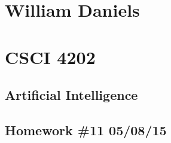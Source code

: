 \documentclass[11pt]{article}
\begin{document}
\begin{center}
\section*{William Daniels}
\section*{CSCI 4202}
\subsection*{Artificial Intelligence}
\subsection*{Homework \#11 05/08/15}
\end{center}

\vspace{.25cm}
\end{document}
